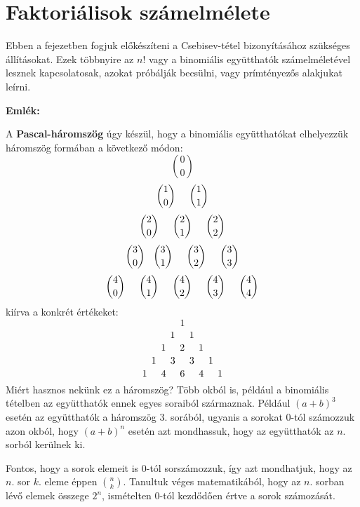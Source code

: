 \documentclass[12pt]{book}
\theoremstyle{plain} %
\theoremstyle{definition} %
\theoremstyle{remark}
\numberwithin{equation}{section}  %
\begin{document}
	
	\section{Faktoriálisok számelmélete}
	
	Ebben a fejezetben fogjuk előkészíteni a Csebisev-tétel bizonyításához szükséges állításokat. Ezek többnyire az $n!$ vagy a binomiális együtthatók számelméletével lesznek kapcsolatosak, azokat próbálják becsülni, vagy prímtényezős alakjukat leírni.
	
	\textbf{Emlék: }
	
	A \textbf{Pascal-háromszög} úgy készül, hogy a binomiális együtthatókat elhelyezzük háromszög formában a következő módon:
	\[ {0\choose0} \]
	\[ {1\choose0} \hspace{5mm} {1\choose1}  \]
	\[ {2\choose0} \hspace{5mm} {2\choose1} \hspace{5mm} {2\choose2} \]
	\[ {3\choose0} \hspace{3mm} {3\choose1} \hspace{5mm} {3\choose2} \hspace{5mm} {3\choose3}\]
	\[ {4\choose0} \hspace{5mm} {4\choose1} \hspace{5mm} {4\choose2} \hspace{5mm} {4\choose3} \hspace{5mm} {4\choose4}\]
	kiírva a konkrét értékeket:
	\[ 1 \]
	\[ 1 \hspace{5mm} 1  \]
	\[ 1 \hspace{5mm} 2 \hspace{5mm} 1 \]
	\[ 1 \hspace{5mm} 3 \hspace{5mm} 3 \hspace{5mm} 1\]
	\[ 1 \hspace{5mm} 4 \hspace{5mm} 6 \hspace{5mm} 4 \hspace{5mm} 1\]
	Miért hasznos nekünk ez a háromszög? Több okból is, például a binomiális tételben az együtthatók ennek egyes soraiból származnak. Például $(a+b)^3$ esetén az együtthatók a háromszög $3$. sorából, ugyanis a sorokat $0$-tól számozzuk azon okból, hogy $(a+b)^n$ esetén azt mondhassuk, hogy az együtthatók az $n$. sorból kerülnek ki.
	
	Fontos, hogy a sorok elemeit is $0$-tól sorszámozzuk, így azt mondhatjuk, hogy az $n$. sor $k$. eleme éppen ${n\choose k}$. Tanultuk véges matematikából, hogy az $n$. sorban lévő elemek összege $2^n$, ismételten $0$-tól kezdődően értve a sorok számozását.
	
\end{document}
